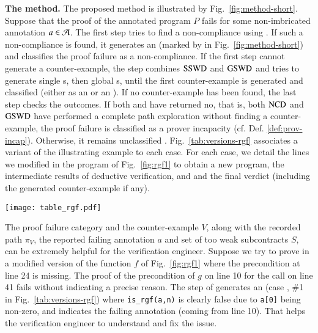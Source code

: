 \textbf{The method.}
The proposed method is illustrated by Fig.~\ref{fig:method-short}.
Suppose that the proof of the annotated program $P$ fails for some non-imbricated annotation $a\in{\ensuremath\mathcal{A}}$.
The first step tries to find a non-compliance using \NCD. 
If such a non-compliance is found, it generates an \NCCE (marked by 
in Fig.~\ref{fig:method-short})
and classifies the proof failure as a non-compliance.
If the first step cannot generate a counter-example,
the \SWD step combines $\mathrm{SSWD}$ and $\mathrm{GSWD}$ 
and tries to generate single \SWCE{}s, then global \SWCE{}s, 
until the first counter-example is generated and classified 
(either as an \NCCE {} or an \SWCE {}).
If no counter-example has been found, the last step checks the outcomes.
If both \NCD and \SWD have returned \textsf{no}, that is, 
both  $\mathrm{NCD}$  and $\mathrm{GSWD}$ have performed a complete path exploration 
without finding a counter-example,
the proof failure is classified as a prover incapacity  (cf. Def. \ref{def:prov-incap}).
Otherwise, it  remains unclassified .
Fig.~\ref{tab:versions-rgf} associates a variant of the illustrating example to
each case.
For each case, we detail the lines we modified in the program of
Fig.~\ref{fig:rgf1} to obtain a new program, the intermediate results of
deductive verification, \NCD and \SWD and the final verdict (including the
generated counter-example if any).


\begin{figure*}[bt]\centering
  \texttt{[image: table\_rgf.pdf]}
  \caption{Method results for different versions of the illustrating example.}
  \label{tab:versions-rgf}
\end{figure*}


The proof failure category and the counter-example $V$, along with  
the recorded path $\pi_V$,
the reported failing annotation $a$ and set of too weak subcontracts $S$,
can be extremely helpful for the verification engineer.
Suppose we try to prove in \Wp a modified version of the function $f$ of
Fig.~\ref{fig:rgf1}
where the precondition at line 24 is missing.
The proof of the precondition of $g$ on line 10 for the call on line 41
fails without indicating a precise reason.
The \NCD step of \stady  generates an \NCCE (case ,
\#1 in Fig.~\ref{tab:versions-rgf}) where \lstinline'is_rgf(a,n)'
is clearly false due to \lstinline'a[0]' being non-zero, and indicates the
failing annotation (coming from line 10).  
That helps the verification engineer to understand and fix the issue. 




